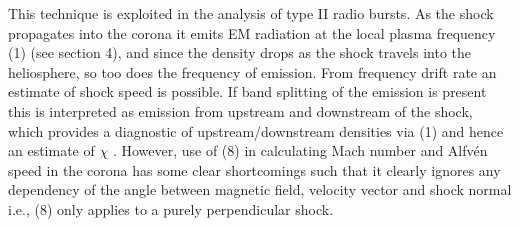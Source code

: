 This technique is exploited in the analysis of type II radio bursts. As the shock propagates into the corona it emits EM radiation at the local plasma frequency (1) (see section 4), and since the density drops as the shock travels into the heliosphere, so too does the frequency of emission. From frequency drift rate an estimate of shock speed is possible. If band splitting of the emission is present this is interpreted as emission from upstream and downstream of the shock, which provides a diagnostic of upstream/downstream densities via (1) and hence an estimate of $\chi$ \citep{vrsnak2002}. However, use of (8) in calculating Mach number and Alfv\'{e}n speed in the corona has some clear shortcomings such that it clearly ignores any dependency of the angle between magnetic field, velocity vector and shock normal i.e., (8) only applies to a purely perpendicular shock.

